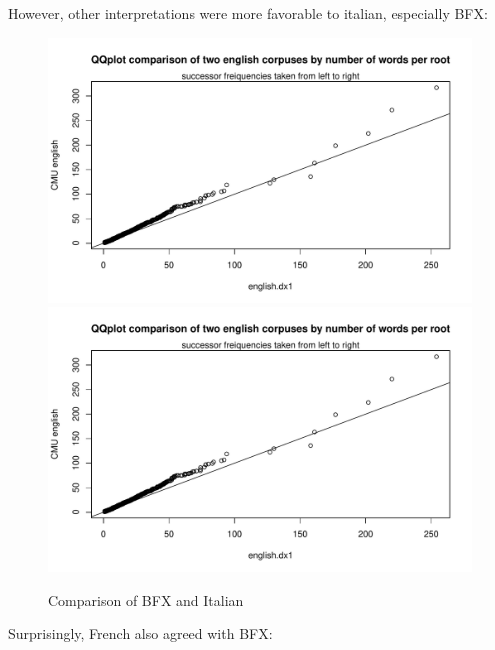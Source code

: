 \documentclass{article}
\begin{document}
However, other interpretations were more favorable to italian, especially BFX:
		\begin{figure}[H]
		\centering
		\caption{Comparison of BFX and Italian}
		\includegraphics[scale=.7,page=22]{plots.pdf}
		\includegraphics[scale=.7,page=23]{plots.pdf}
		\end{figure}

Surprisingly, French also agreed with BFX:
\end{document}
